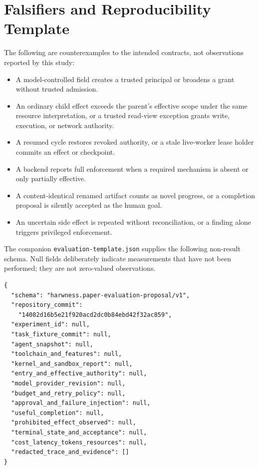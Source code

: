 \section{Falsifiers and Reproducibility Template}
\label{app:falsifiers}
The following are counterexamples to the intended contracts, not observations reported by this study:
\begin{itemize}
\item A model-controlled field creates a trusted principal or broadens a grant without trusted admission.
\item An ordinary child effect exceeds the parent's effective scope under the same resource interpretation, or a trusted read-view exception grants write, execution, or network authority.
\item A resumed cycle restores revoked authority, or a stale live-worker lease holder commits an effect or checkpoint.
\item A backend reports full enforcement when a required mechanism is absent or only partially effective.
\item A content-identical renamed artifact counts as novel progress, or a completion proposal is silently accepted as the human goal.
\item An uncertain side effect is repeated without reconciliation, or a finding alone triggers privileged enforcement.
\end{itemize}
The companion \texttt{evaluation-template.json} supplies the following non-result schema. Null fields deliberately indicate measurements that have not been performed; they are not zero-valued observations.

\begin{Verbatim}[fontsize=\small,frame=single,framesep=7pt]
{
  "schema": "harwness.paper-evaluation-proposal/v1",
  "repository_commit":
    "14082d16b5e21f920acd2dc0b84ebd42f32ac859",
  "experiment_id": null,
  "task_fixture_commit": null,
  "agent_snapshot": null,
  "toolchain_and_features": null,
  "kernel_and_sandbox_report": null,
  "entry_and_effective_authority": null,
  "model_provider_revision": null,
  "budget_and_retry_policy": null,
  "approval_and_failure_injection": null,
  "useful_completion": null,
  "prohibited_effect_observed": null,
  "terminal_state_and_acceptance": null,
  "cost_latency_tokens_resources": null,
  "redacted_trace_and_evidence": []
}
\end{Verbatim}
